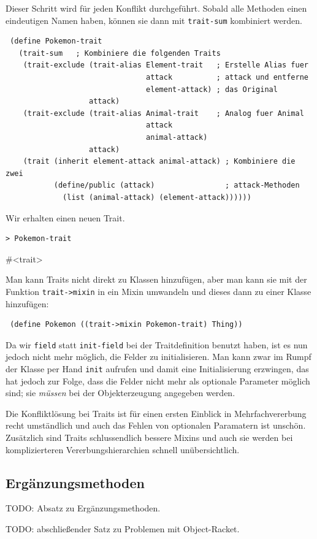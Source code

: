 Dieser Schritt wird für jeden Konflikt durchgeführt. Sobald alle Methoden einen eindeutigen Namen haben, können sie dann mit \texttt{trait-sum} kombiniert werden.

\begin{lstlisting}
 (define Pokemon-trait
   (trait-sum   ; Kombiniere die folgenden Traits
    (trait-exclude (trait-alias Element-trait   ; Erstelle Alias fuer
                                attack          ; attack und entferne
                                element-attack) ; das Original
                   attack)
    (trait-exclude (trait-alias Animal-trait    ; Analog fuer Animal
                                attack         
                                animal-attack)
                   attack)
    (trait (inherit element-attack animal-attack) ; Kombiniere die zwei
           (define/public (attack)                ; attack-Methoden
             (list (animal-attack) (element-attack))))))
\end{lstlisting}

Wir erhalten einen neuen Trait. 

\begin{lstlisting}
> Pokemon-trait
\end{lstlisting}
{\routput \#<trait>}

Man kann Traits nicht direkt zu Klassen hinzufügen, aber man kann sie mit der Funktion \texttt{trait->mixin} in ein Mixin umwandeln und dieses dann zu einer Klasse hinzufügen:

\begin{lstlisting}
 (define Pokemon ((trait->mixin Pokemon-trait) Thing))
\end{lstlisting}

Da wir \texttt{field} statt \texttt{init-field} bei der Traitdefinition benutzt haben, ist es nun jedoch nicht mehr möglich, die Felder zu initialisieren. Man kann zwar im Rumpf der Klasse per Hand \texttt{init} aufrufen und damit eine Initialisierung erzwingen, das hat jedoch zur Folge, dass die Felder nicht mehr als optionale Parameter möglich sind; sie \textit{müssen} bei der Objekterzeugung angegeben werden.

Die Konfliktlösung bei Traits ist für einen ersten Einblick in Mehrfachvererbung recht umständlich und auch das Fehlen von optionalen Paramatern ist unschön. Zusätzlich sind Traits schlussendlich bessere Mixins und auch sie werden bei komplizierteren Vererbungshierarchien schnell unübersichtlich.

\subsection{Ergänzungsmethoden}

TODO: Absatz zu Ergänzungsmethoden. %

TODO: abschließender Satz zu Problemen mit Object-Racket. %

